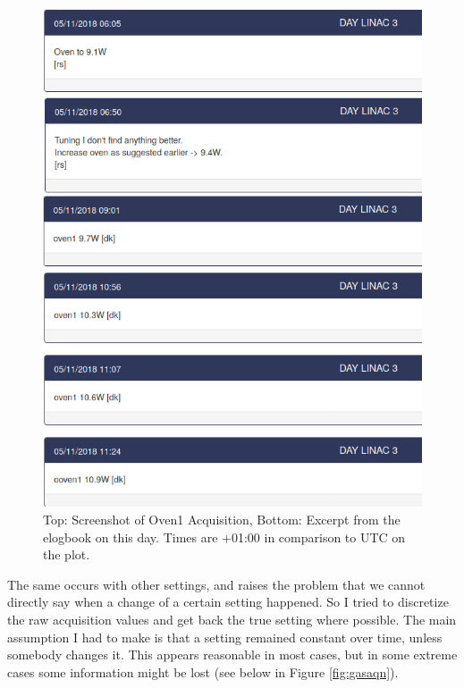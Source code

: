 \documentclass[12pt,a4paper]{article}
\begin{document}
\begin{figure}
\includegraphics[width=!,totalheight=!,scale=1.7]{images/oven1example_logbook_05112018.png}
\caption{Top: Screenshot of Oven1 Acquisition, Bottom: Excerpt from the elogbook on this day. Times are +01:00 in comparison to UTC on the plot.}
\label{fig:elogbook}
\end{figure}

The same occurs with other settings, and raises the problem that we cannot directly say when a change of a certain setting happened. So I
tried to discretize the raw acquisition values and get back the true setting where possible. The main assumption I had to make is that a
setting remained constant over time, unless somebody changes it. This appears reasonable in most cases, but in some extreme cases some
information might be lost (see below in Figure \ref{fig:gasaqn}).
\end{document}
